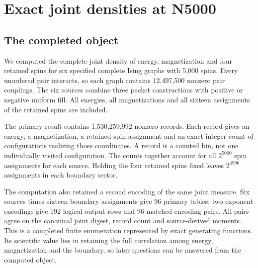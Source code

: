 \chapter{Exact joint densities at N5000}\label{exact-joint-densities-at-n5000}

\section{The completed object}\label{the-completed-object}

We computed the complete joint density of energy, magnetization and four retained spins for six specified complete Ising graphs with 5,000 spins. Every unordered pair interacts, so each graph contains 12,497,500 nonzero pair couplings. The six sources combine three packet constructions with positive or negative uniform fill. All energies, all magnetizations and all sixteen assignments of the retained spins are included.

The primary result contains 1,530,259,992 nonzero records. Each record gives an energy, a magnetization, a retained-spin assignment and an exact integer count of configurations realizing those coordinates. A record is a counted bin, not one individually visited configuration. The counts together account for all \(2^{5000}\) spin assignments for each source. Holding the four retained spins fixed leaves \(2^{4996}\) assignments in each boundary sector.

The computation also retained a second encoding of the same joint measure. Six sources times sixteen boundary assignments give 96 primary tables; two exponent encodings give 192 logical output rows and 96 matched encoding pairs. All pairs agree on the canonical joint digest, record count and source-derived moments. This is a completed finite enumeration represented by exact generating functions. Its scientific value lies in retaining the full correlation among energy, magnetization and the boundary, so later questions can be answered from the computed object.

